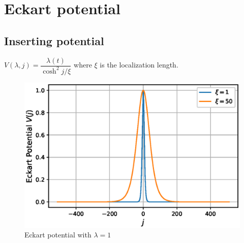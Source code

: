 \documentclass[11pt,a4paper]{article}
\begin{document}
\section{Eckart potential}
\subsection{Inserting potential}
$V(\lambda,j) =\dfrac{ \lambda(t)}{\cosh^2 j/ \xi}$ where $\xi$ is the localization length.


\begin{figure}[!ht]
\begin{center}
\includegraphics[scale=0.68]{pics/eckart_potn.eps}
\caption{Eckart potential with $\lambda=1$ }
\end{center}
\end{figure}
\end{document}
